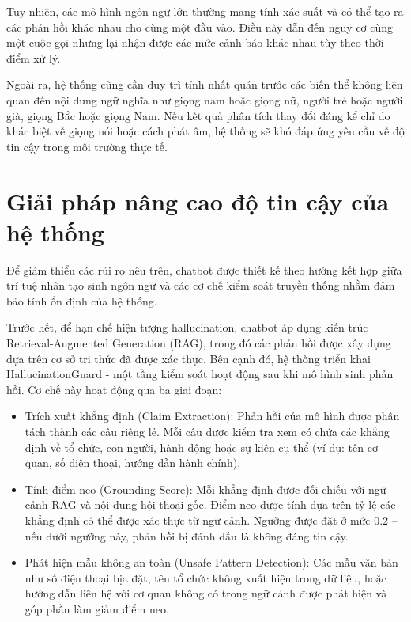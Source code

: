 Tuy nhiên, các mô hình ngôn ngữ lớn thường mang tính xác suất và có thể tạo ra các phản hồi khác nhau cho cùng một đầu vào. Điều này dẫn đến nguy cơ cùng một cuộc gọi nhưng lại nhận được các mức cảnh báo khác nhau tùy theo thời điểm xử lý.

Ngoài ra, hệ thống cũng cần duy trì tính nhất quán trước các biến thể không liên quan đến nội dung ngữ nghĩa như giọng nam hoặc giọng nữ, người trẻ hoặc người già, giọng Bắc hoặc giọng Nam. Nếu kết quả phân tích thay đổi đáng kể chỉ do khác biệt về giọng nói hoặc cách phát âm, hệ thống sẽ khó đáp ứng yêu cầu về độ tin cậy trong môi trường thực tế.

\section{Giải pháp nâng cao độ tin cậy của hệ thống}
Để giảm thiểu các rủi ro nêu trên, chatbot được thiết kế theo hướng kết hợp giữa trí tuệ nhân tạo sinh ngôn ngữ và các cơ chế kiểm soát truyền thống nhằm đảm bảo tính ổn định của hệ thống.

Trước hết, để hạn chế hiện tượng hallucination, chatbot áp dụng kiến trúc Retrieval-Augmented Generation (RAG), trong đó các phản hồi được xây dựng dựa trên cơ sở tri thức đã được xác thực. Bên cạnh đó, hệ thống triển khai HallucinationGuard - một tầng kiểm soát hoạt động sau khi mô hình sinh phản hồi. Cơ chế này hoạt động qua ba giai đoạn:

\begin{itemize}
    \item {Trích xuất khẳng định (Claim Extraction):} Phản hồi của mô hình được phân tách thành các câu riêng lẻ. Mỗi câu được kiểm tra xem có chứa các khẳng định về tổ chức, con người, hành động hoặc sự kiện cụ thể (ví dụ: tên cơ quan, số điện thoại, hướng dẫn hành chính).
    \item {Tính điểm neo (Grounding Score):} Mỗi khẳng định được đối chiếu với ngữ cảnh RAG và nội dung hội thoại gốc. Điểm neo được tính dựa trên tỷ lệ các khẳng định có thể được xác thực từ ngữ cảnh. Ngưỡng được đặt ở mức 0.2 -- nếu dưới ngưỡng này, phản hồi bị đánh dấu là không đáng tin cậy.
    \item {Phát hiện mẫu không an toàn (Unsafe Pattern Detection):} Các mẫu văn bản như số điện thoại bịa đặt, tên tổ chức không xuất hiện trong dữ liệu, hoặc hướng dẫn liên hệ với cơ quan không có trong ngữ cảnh được phát hiện và góp phần làm giảm điểm neo.
\end{itemize}

